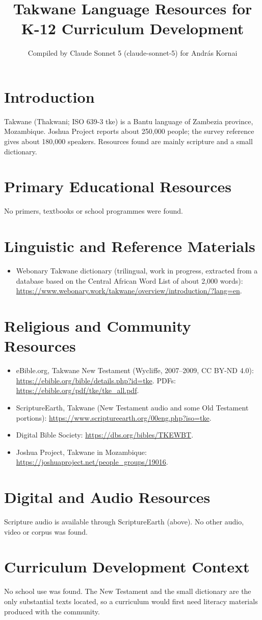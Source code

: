 \documentclass[12pt]{article}
\title{Takwane Language Resources for K-12 Curriculum Development}
\author{Compiled by Claude Sonnet 5 (claude-sonnet-5) for Andr\'as Kornai}
\date{}
\begin{document}
\maketitle

\section{Introduction}
Takwane (Thakwani; ISO 639-3 tke) is a Bantu language of Zambezia province, Mozambique. Joshua Project reports about 250,000 people; the survey reference gives about 180,000 speakers. Resources found are mainly scripture and a small dictionary.

\section{Primary Educational Resources}
No primers, textbooks or school programmes were found.

\section{Linguistic and Reference Materials}
\begin{itemize}
\item Webonary Takwane dictionary (trilingual, work in progress, extracted from a database based on the Central African Word List of about 2,000 words): \url{https://www.webonary.work/takwane/overview/introduction/?lang=en}.
\end{itemize}

\section{Religious and Community Resources}
\begin{itemize}
\item eBible.org, Takwane New Testament (Wycliffe, 2007--2009, CC BY-ND 4.0): \url{https://ebible.org/bible/details.php?id=tke}. PDFs: \url{https://ebible.org/pdf/tke/tke_all.pdf}.
\item ScriptureEarth, Takwane (New Testament audio and some Old Testament portions): \url{https://www.scriptureearth.org/00eng.php?iso=tke}.
\item Digital Bible Society: \url{https://dbs.org/bibles/TKEWBT}.
\item Joshua Project, Takwane in Mozambique: \url{https://joshuaproject.net/people_groups/19016}.
\end{itemize}

\section{Digital and Audio Resources}
Scripture audio is available through ScriptureEarth (above). No other audio, video or corpus was found.

\section{Curriculum Development Context}
No school use was found. The New Testament and the small dictionary are the only substantial texts located, so a curriculum would first need literacy materials produced with the community.
\end{document}
